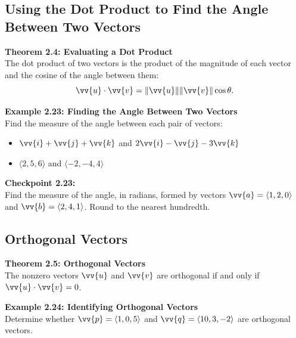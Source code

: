 \documentclass{article}
\begin{document}
\subsection*{Using the Dot Product to Find the Angle Between Two Vectors}

\begin{theorembox}
    \textbf{Theorem 2.4: Evaluating a Dot Product} \\
    The dot product of two vectors is the product of the magnitude of each vector and the cosine of the angle between them:
    \[
    \vv{u} \cdot \vv{v} = \|\vv{u}\| \|\vv{v}\| \cos \theta.
    \]
\end{theorembox}

\begin{examplebox}
    \textbf{Example 2.23: Finding the Angle Between Two Vectors} \\
    Find the measure of the angle between each pair of vectors:
    \begin{itemize}
        \item \(\vv{i} + \vv{j} + \vv{k}\) and \(2\vv{i} - \vv{j} - 3\vv{k}\)
        \item \(\langle 2, 5, 6 \rangle\) and \(\langle -2, -4, 4 \rangle\)
    \end{itemize}
\end{examplebox}

\begin{exercisebox}
    \textbf{Checkpoint 2.23:} \\
    Find the measure of the angle, in radians, formed by vectors \(\vv{a} = \langle 1, 2, 0 \rangle\) and \(\vv{b} = \langle 2, 4, 1 \rangle\). Round to the nearest hundredth.
\end{exercisebox}

\subsection*{Orthogonal Vectors}

\begin{theorembox}
    \textbf{Theorem 2.5: Orthogonal Vectors} \\
    The nonzero vectors \(\vv{u}\) and \(\vv{v}\) are orthogonal if and only if \(\vv{u} \cdot \vv{v} = 0\).
\end{theorembox}

\begin{examplebox}
    \textbf{Example 2.24: Identifying Orthogonal Vectors} \\
    Determine whether \(\vv{p} = \langle 1, 0, 5 \rangle\) and \(\vv{q} = \langle 10, 3, -2 \rangle\) are orthogonal vectors.
\end{examplebox}
\end{document}
